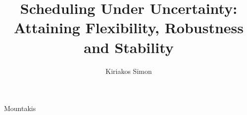 \documentclass[print,nativefonts]{dissertation}
\begin{document}
\title[]{{Scheduling Under Uncertainty: Attaining Flexibility, Robustness and Stability}}
\author{Kiriakos Simon}{Mountakis}

\frontmatter


\end{document}
